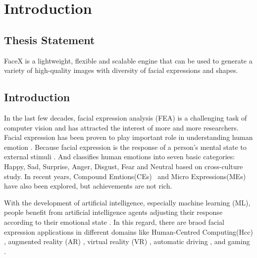 \chapter{Introduction}
\label{cha:intro}


\section{Thesis Statement}
\label{sec:thesisstatement}
FaceX is a lightweight, flexible and scalable engine that can be used to generate a variety of high-quality images with diversity of facial expressions and shapes. 


\section{Introduction}
\label{sec:problemstatement}

In the last few decades, facial expression analysis (FEA) is a challenging task of computer vision and has attracted the interest of more and more researchers. Facial expression has been proven to play important role in understanding human emotion \citep{Mehrabian_Russell_1974}. Because facial expression is the response of a person's mental state to external stimuli \citep{Cabanac_2002}. And \citeauthor{ekmanArgumentBasicEmotions1992} classifies human emotions into seven basic categories: Happy, Sad, Surprise, Anger, Disgust, Fear and Neutral based on cross-culture study. In recent years, Compound Emtions(CEs)~\citep{duCompoundFacialExpressions2014} and Micro Expressions(MEs)~\citep{ekmanDarwinDeceptionFacial2006} have also been explored, but achievements are not rich.

With the development of artificial intelligence, especially machine learning (ML), people benefit from artificial intelligence agents adjusting their response according to their emotional state \citep{adolphsInvestigatingEmotionsFunctional2018}. In this regard, 
there are braod facial expression applications in different domains like Human-Centred Computing(Hcc) \citep{cowieEmotionRecognitionHumancomputer2001}, augmented reality (AR) \citep{chenAugmentedRealitybasedSelffacial2015}, virtual reality (VR) \citep{bekeleUnderstandingHowAdolescents2013}, automatic driving \citep{jabonFacialExpressionAnalysis2011}, and gaming \citep{lankesFacialExpressionsGame2008}. 

